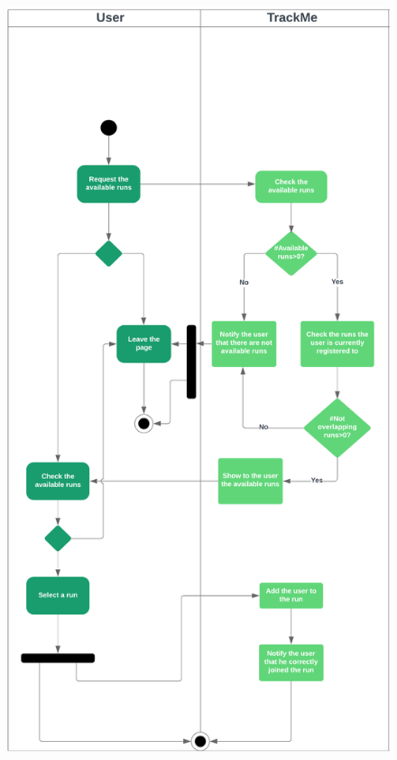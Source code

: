 \documentclass{article}
\begin{document}
\begin{legal}
\begin{legal}
\begin{legal}
{\begin{legal}
\begin{figure}[H]
  				\includegraphics[width=130mm]{./images/Join-a-run-activity-diag.png}
				\end{figure}
			\end{legal}
			}
    		

\end{legal}
\end{legal}
\end{legal}
\end{document}
